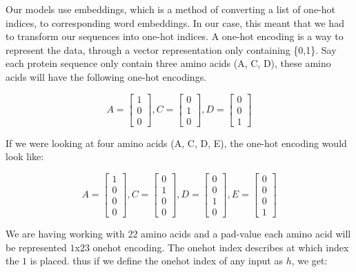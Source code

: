 \noindent
Our models use embeddings, which is a method of converting a list of one-hot indices, to corresponding word embeddings. In our case, this meant that we had to transform our sequences into one-hot indices. A one-hot encoding is a way to represent the data, through a vector representation only containing \{0,1\}. Say each protein sequence only contain three amino acids (A, C, D), these amino acids will have the following one-hot encodings.

$$
A = \begin{bmatrix}
1 \\
0 \\
0
\end{bmatrix},
C = \begin{bmatrix}
0 \\
1 \\
0
\end{bmatrix},
D= \begin{bmatrix}
0 \\
0 \\
1
\end{bmatrix}
$$

\noindent
If we were looking at four amino acids (A, C, D, E), the one-hot encoding would look like:

$$
A = \begin{bmatrix}
1 \\
0 \\
0 \\
0
\end{bmatrix},
C = \begin{bmatrix}
0 \\
1 \\
0 \\
0
\end{bmatrix},
D= \begin{bmatrix}
0 \\
0 \\
1 \\
0
\end{bmatrix},
E= \begin{bmatrix}
0 \\
0 \\
0 \\
1
\end{bmatrix}
$$

\noindent
We are having working with 22 amino acids and a pad-value each amino acid will be represented $1$x$23$ onehot encoding. The onehot index describes at which index the $1$ is placed. thus if we define the onehot index of any input as $h$, we get:

